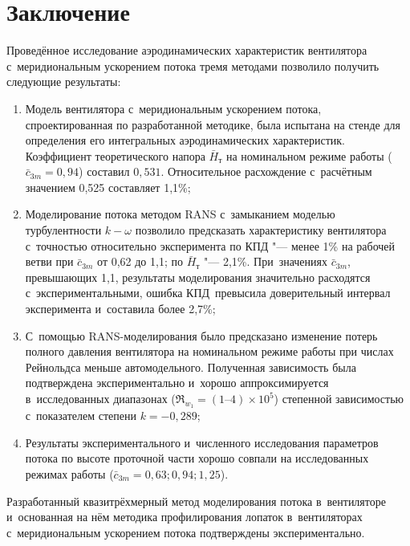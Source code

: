 \section{Заключение}
Проведённое исследование аэродинамических характеристик вентилятора с~меридиональным ускорением потока тремя методами позволило получить следующие результаты:
\begin{enumerate}
	\item Модель вентилятора с~меридиональным ускорением потока, спроектированная по разработанной методике, была испытана на стенде для определения его интегральных аэродинамических характеристик.
	Коэффициент теоретического напора \(\bar{H}_\text{т}\) на номинальном режиме работы (\(\bar{c}_{3m}=0,94\)) составил \(0,531\).
 Относительное расхождение с~расчётным значением 0,525 составляет 1,1\%;

	\item Моделирование потока методом RANS с~замыканием моделью турбулентности \(k-\omega\) позволило предсказать характеристику вентилятора с~точностью относительно эксперимента по КПД "--- менее 1\% на рабочей ветви при \(\bar{c}_{3m}\) от 0,62 до 1,1; по \(\bar{H}_\text{т}\)  "--- 2,1\%.
 При~значениях \(\bar{c}_{3m}\), превышающих 1,1, результаты моделирования значительно расходятся с~экспериментальными, ошибка КПД~превысила доверительный интервал эксперимента и~составила более 2,7\%;

	\item С~помощью RANS-моделирования было предсказано изменение потерь полного давления вентилятора на номинальном режиме работы при числах Рейнольдса меньше автомодельного.
	Полученная зависимость была подтверждена экспериментально и~хорошо аппроксимируется в~исследованных диапазонах (\(\Re_{w_1} = (1\text{--}4) \times 10^5\)) степенной зависимостью с~показателем степени \(k=-0,289\);

	\item Результаты экспериментального и~численного исследования параметров потока по высоте проточной части хорошо совпали на исследованных режимах работы (\(\bar{c}_{3m}=0,63; 0,94; 1,25\)).
\end{enumerate}

Разработанный квазитрёхмерный метод моделирования потока в~вентиляторе и~основанная на нём методика профилирования лопаток в~вентиляторах с~меридиональным ускорением потока подтверждены экспериментально.

\FloatBarrier

